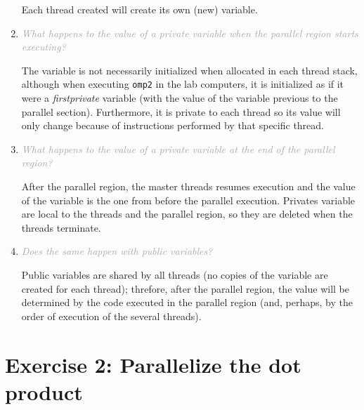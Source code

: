 \documentclass{article}
\newcommand{\greyItem}[1]{\item\emph{\textcolor{darkgray}{#1}}}
\begin{document}
\begin{enumerate}[label=1.\arabic*,leftmargin=*]
Each thread created will create its own (new) variable.

\greyItem{What happens to the value of a private variable when the parallel region starts executing?}

The variable is not necessarily initialized when allocated in each thread stack, although when executing \texttt{omp2} in the lab computers, it is initialized as if it were a \emph{firstprivate} variable (with the value of the variable previous to the parallel section). Furthermore, it is private to each thread so its value will only change because of instructions performed by that specific thread.

\greyItem{What happens to the value of a private variable at the end of the parallel region?}

After the parallel region, the master threads resumes execution and the value of the variable is the one from before the parallel execution. Privates variable are local to the threads and the parallel region, so they are deleted when the threads terminate.

\greyItem{Does the same happen with public variables?}

Public variables are shared by all threads (no copies of the variable are created for each thread); threfore, after the parallel region, the value will be determined by the code executed in the parallel region (and, perhaps, by the order of execution of the several threads).

\end{enumerate}


\section{Exercise 2: Parallelize the dot product}
\end{document}
